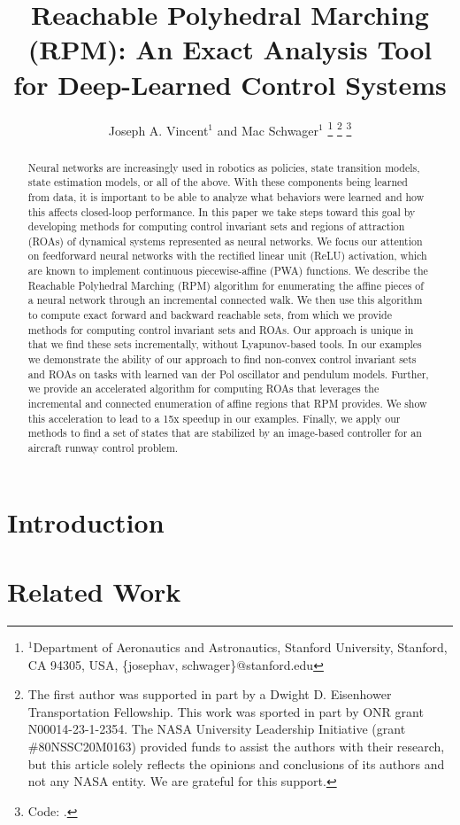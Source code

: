 \documentclass[letterpaper, 10 pt, conference]{ieeeconf}  %
\title{\LARGE \bf
Reachable Polyhedral Marching (RPM): An Exact Analysis Tool for Deep-Learned Control Systems}
\author{Joseph A. Vincent$^{1}$ and Mac Schwager$^{1}$%
\thanks{$^{1}$Department of Aeronautics and Astronautics, Stanford University, Stanford, CA 94305, USA, {\texttt\small \{josephav, schwager\}@stanford.edu}}
\thanks{The first author was supported in part by a Dwight D. Eisenhower Transportation Fellowship. This work was sported in part by ONR grant N00014-23-1-2354. The NASA University Leadership Initiative (grant \#80NSSC20M0163) provided funds to assist the authors with their research, but this article solely reflects the opinions and conclusions of its authors and not any NASA entity. We are grateful for this support.}%
\thanks{Code: \href{https://github.com/StanfordMSL/Neural-Network-Reach}{\text{https://github.com/StanfordMSL/Neural-Network-Reach}}.}
}
\begin{document}
\maketitle
\thispagestyle{plain}
\pagestyle{plain}

\begin{abstract} \label{Abstract}
Neural networks are increasingly used in robotics as policies, state transition models, state estimation models, or all of the above.
With these components being learned from data, it is important to be able to analyze what behaviors were learned and how this affects closed-loop performance.
In this paper we take steps toward this goal by developing methods for computing control invariant sets and regions of attraction (ROAs) of dynamical systems represented as neural networks.
We focus our attention on feedforward neural networks with the rectified linear unit (ReLU) activation, which are known to implement continuous piecewise-affine (PWA) functions.
We describe the Reachable Polyhedral Marching (RPM) algorithm for enumerating the affine pieces of a neural network through an incremental connected walk.
We then use this algorithm to compute exact forward and backward reachable sets, from which we provide methods for computing control invariant sets and ROAs.
Our approach is unique in that we find these sets incrementally, without Lyapunov-based tools.
In our examples we demonstrate the ability of our approach to find non-convex control invariant sets and ROAs on tasks with learned van der Pol oscillator and pendulum models.
Further, we provide an accelerated algorithm for computing ROAs that leverages the incremental and connected enumeration of affine regions that RPM provides.
We show this acceleration to lead to a 15x speedup in our examples.
Finally, we apply our methods to find a set of states that are stabilized by an image-based controller for an aircraft runway control problem.
\end{abstract}

\section{Introduction}
\label{Sec:Introduction}


\section{Related Work} 
\label{Sec:RelatedWork}

\end{document}

